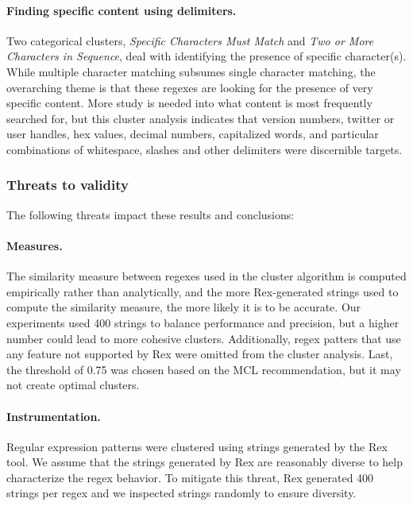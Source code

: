 \paragraph{Finding specific content using delimiters.}  Two categorical clusters, \emph{Specific Characters Must Match} and \emph{Two or More Characters in Sequence}, deal with identifying the presence of specific character(s).  While multiple character matching subsumes single character matching, the overarching theme is that these regexes are looking for the presence of very specific content.  More study is needed into what content is most frequently searched for, but this cluster analysis indicates that version numbers, twitter or user handles, hex values, decimal numbers, capitalized words, and particular combinations of whitespace, slashes and other delimiters were discernible targets.

\subsubsection{Threats to validity}
The following threats impact these results and conclusions:

\paragraph{Measures.}  The similarity measure between regexes used in the cluster algorithm is computed empirically rather than analytically, and the more Rex-generated strings used to compute the similarity measure, the more likely it is to be accurate. Our experiments used 400 strings to balance performance and precision, but a higher number could lead to more cohesive clusters. Additionally, regex patters that use any feature not supported by Rex were omitted from the cluster analysis. Last, the threshold of 0.75 was chosen based on the MCL recommendation, but it may not create optimal clusters.

\paragraph{Instrumentation.} Regular expression patterns were clustered using strings generated by the Rex tool. We assume that the strings generated by Rex are reasonably diverse to help characterize the regex behavior. To mitigate this threat, Rex generated 400 strings per regex and we inspected strings randomly to ensure diversity.


